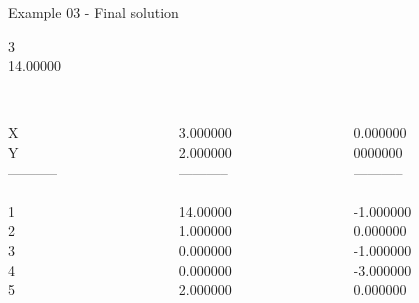 \begin{frame}{Example 03 - Final solution}

  3\\
  14.00000\\

\begin{columns}[t]
\begin{column}{0.3\textwidth}
\\
X\\
Y\\
-----------\\
\\
1\\
2\\
3\\
4\\
5\\

\end{column}
\begin{column}{0.3\textwidth}
\\
3.000000\\
2.000000\\
-----------\\

\\
14.00000\\
1.000000\\
0.000000\\
0.000000\\
2.000000\\

\end{column}

\begin{column}{0.3\textwidth}
\\
0.000000\\
0000000\\

-----------\\
\\
-1.000000\\
0.000000\\
-1.000000\\
-3.000000\\
0.000000\\
\end{column}
\end{columns}
\end{frame}
